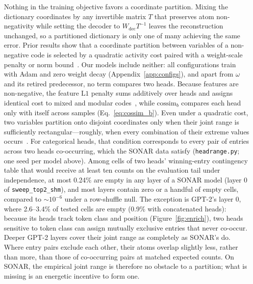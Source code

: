 Nothing in the training objective favors a coordinate partition. Mixing
the dictionary coordinates by any invertible matrix $T$ that preserves
atom non-negativity while setting the decoder to $W_{\mathrm{dec}}T^{-1}$
leaves the reconstruction unchanged, so a partitioned dictionary is only
one of many achieving the same error. Prior results show that a
coordinate partition between variables of a non-negative code is selected
by a quadratic activity cost paired with a weight-scale penalty or norm
bound~\cite{whittington2023,dorrell2025}. Our models include neither: all
configurations train with Adam and zero weight decay
(Appendix~\ref{app:configs}), and apart from $\omega$ and its retired
predecessor, no term compares two heads. Because features are
non-negative, the feature $\mathrm{L1}$ penalty sums additively over heads
and assigns identical cost to mixed and modular codes~\cite{dorrell2025},
while $\mathrm{cossim}_b$ compares each head only with itself across
samples (Eq.~\eqref{eq:cossim_b}). Even under a quadratic cost, two
variables partition onto disjoint coordinates only when their joint range
is sufficiently rectangular---roughly, when every combination of their
extreme values occurs~\cite{dorrell2025}. For categorical heads, that
condition corresponds to every pair of entries across two heads
co-occurring, which the SONAR data satisfy (\texttt{headrange.py}; one
seed per model above). Among cells of two heads' winning-entry contingency
table that would receive at least ten counts on the evaluation tail under
independence, at most 0.24\% are empty in any layer of a SONAR model
(layer 0 of \texttt{sweep\_top2\_shm}), and most layers contain zero or a
handful of empty cells, compared to ${\sim}10^{-6}$ under a row-shuffle
null. The exception is GPT-2's layer 0, where 2.6--3.4\% of tested cells
are empty (0.9\% with concatenated heads): because its heads track token
class and position (Figure~\ref{fig:enrich}), two heads sensitive to token
class can assign mutually exclusive entries that never co-occur. Deeper
GPT-2 layers cover their joint range as completely as SONAR's do. Where
entry pairs exclude each other, their atoms overlap slightly less, rather
than more, than those of co-occurring pairs at matched expected counts. On
SONAR, the empirical joint range is therefore no obstacle to a partition;
what is missing is an energetic incentive to form one.

